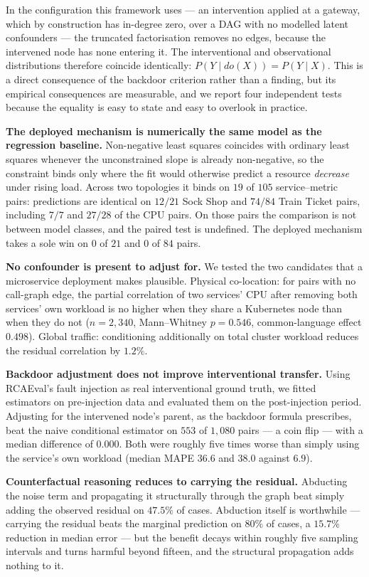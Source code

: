 \documentclass[journal, 10pt]{IEEEtran}
\begin{document}
In the configuration this framework uses --- an intervention applied at a
gateway, which by construction has in-degree zero, over a DAG with no modelled
latent confounders --- the truncated factorisation removes no edges, because the
intervened node has none entering it. The interventional and observational
distributions therefore coincide identically:
$P(Y \mid do(X)) = P(Y \mid X)$. This is a direct consequence of the backdoor
criterion rather than a finding, but its empirical consequences are measurable,
and we report four independent tests because the equality is easy to state and
easy to overlook in practice.

\textbf{The deployed mechanism is numerically the same model as the regression
baseline.} Non-negative least squares coincides with ordinary least squares
whenever the unconstrained slope is already non-negative, so the constraint binds
only where the fit would otherwise predict a resource \emph{decrease} under
rising load. Across two topologies it binds on $19$ of $105$ service--metric
pairs: predictions are identical on $12/21$ Sock Shop and $74/84$ Train Ticket
pairs, including $7/7$ and $27/28$ of the CPU pairs. On those pairs the
comparison is not between model classes, and the paired test is undefined. The
deployed mechanism takes a sole win on $0$ of $21$ and $0$ of $84$ pairs.

\textbf{No confounder is present to adjust for.} We tested the two candidates
that a microservice deployment makes plausible. Physical co-location: for pairs
with no call-graph edge, the partial correlation of two services' CPU after
removing both services' own workload is no higher when they share a Kubernetes
node than when they do not ($n=2{,}340$, Mann--Whitney $p=0.546$,
common-language effect $0.498$). Global traffic: conditioning additionally on
total cluster workload reduces the residual correlation by $1.2\%$.

\textbf{Backdoor adjustment does not improve interventional transfer.} Using
RCAEval's fault injection as real interventional ground truth, we fitted
estimators on pre-injection data and evaluated them on the post-injection period.
Adjusting for the intervened node's parent, as the backdoor formula prescribes,
beat the naive conditional estimator on $553$ of $1{,}080$ pairs --- a coin flip
--- with a median difference of $0.000$. Both were roughly five times worse than
simply using the service's own workload (median MAPE $36.6$ and $38.0$ against
$6.9$).

\textbf{Counterfactual reasoning reduces to carrying the residual.} Abducting the
noise term and propagating it structurally through the graph beat simply adding
the observed residual on $47.5\%$ of cases. Abduction itself is worthwhile
--- carrying the residual beats the marginal prediction on $80\%$ of cases, a
$15.7\%$ reduction in median error --- but the benefit decays within roughly
five sampling intervals and turns harmful beyond fifteen, and the structural
propagation adds nothing to it.
\end{document}
